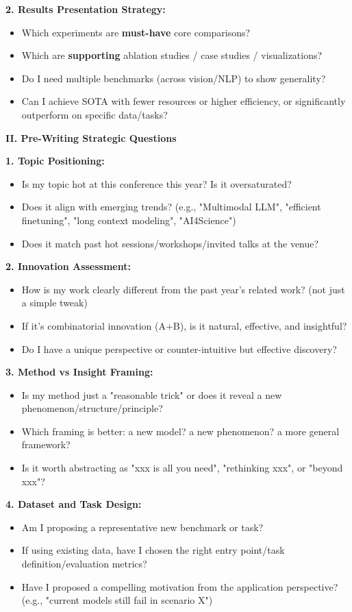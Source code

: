 \documentclass[11pt,a4paper]{article}
\begin{document}
\textbf{2. Results Presentation Strategy:}
\begin{itemize}
    \item Which experiments are \textbf{must-have} core comparisons?
    \item Which are \textbf{supporting} ablation studies / case studies / visualizations?
    \item Do I need multiple benchmarks (across vision/NLP) to show generality?
    \item Can I achieve SOTA with fewer resources or higher efficiency, or significantly outperform on specific data/tasks?
\end{itemize}

\textbf{II. Pre-Writing Strategic Questions}

\textbf{1. Topic Positioning:}
\begin{itemize}
    \item Is my topic hot at this conference this year? Is it oversaturated?
    \item Does it align with emerging trends? (e.g., "Multimodal LLM", "efficient finetuning", "long context modeling", "AI4Science")
    \item Does it match past hot sessions/workshops/invited talks at the venue?
\end{itemize}

\textbf{2. Innovation Assessment:}
\begin{itemize}
    \item How is my work clearly different from the past year's related work? (not just a simple tweak)
    \item If it's combinatorial innovation (A+B), is it natural, effective, and insightful?
    \item Do I have a unique perspective or counter-intuitive but effective discovery?
\end{itemize}

\textbf{3. Method vs Insight Framing:}
\begin{itemize}
    \item Is my method just a "reasonable trick" or does it reveal a new phenomenon/structure/principle?
    \item Which framing is better: a new model? a new phenomenon? a more general framework?
    \item Is it worth abstracting as "xxx is all you need", "rethinking xxx", or "beyond xxx"?
\end{itemize}

\textbf{4. Dataset and Task Design:}
\begin{itemize}
    \item Am I proposing a representative new benchmark or task?
    \item If using existing data, have I chosen the right entry point/task definition/evaluation metrics?
    \item Have I proposed a compelling motivation from the application perspective? (e.g., "current models still fail in scenario X")
\end{itemize}
\end{document}
